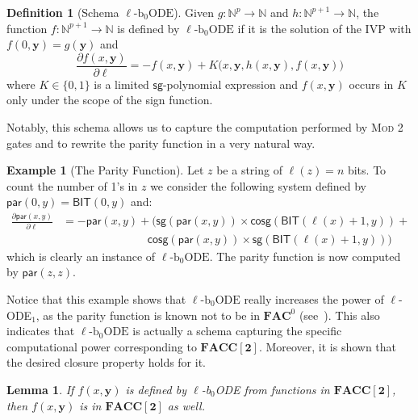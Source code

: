 \documentclass[11pt, oneside]{article}
\newcommand{\fun}[1]{\mathsf{#1}}
\newcommand{\Nat}{\mathbb{N}}
\newcommand{\AC}{\mathbf{FAC}}
\newcommand{\FACC}{\mathbf{FACC[2]}}
\newcommand{\tu}[1]{\mathbf{#1}}
\newtheorem{lemma}{Lemma}
\theoremstyle{definition}
\newtheorem{defn}{Definition}
\newtheorem{example}{Example}
\newcommand{\schODE}{\ell\text{-b}_0\text{ODE}}
\begin{document}
\begin{defn}[Schema $\schODE$]
    Given $g:\Nat^p \to \Nat$ and $h:\Nat^{p+1}\to \Nat$, the function $f:\Nat^{p+1} \to \Nat$ is defined by $\schODE$ if it is the solution of the IVP with $f(0, \tu y) = g(\tu y)$ and
    $$
    \frac{\partial f(x, \tu y)}{\partial \ell} = -f(x, \tu y) + K\big(x, \tu y, h(x, \tu y), f(x, \tu y)\big)
    $$
     where $K\in \{0,1\}$ is a limited $\fun{sg}$-polynomial expression and $f(x, \tu y)$ occurs in $K$ only under the scope of the sign function.
\end{defn}




Notably, this schema allows us to capture the computation performed by \textsc{Mod 2} gates and to rewrite the parity function in a very natural way.

\begin{example}[The Parity Function]\label{ex:parity}
      Let $z$ be a string of $\ell(z)=n$ bits.
      To count the number of 1's in $z$ we consider the following system defined by $ \fun{par}(0, y) = \fun{BIT}(0, y)$ and:
      \begin{align*}
          \frac{\partial \fun{par}(x, y)}{\partial \ell} &= - \fun{par}(x,  y) + \big(\fun{sg}(\fun{par}(x, y))\times \fun{cosg}(\fun{BIT}(\ell(x) + 1, y)) + \\
          &\quad \quad \quad \quad \quad \quad \quad \; \;
          \fun{cosg}(\fun{par}(x, y)) \times \fun{sg}(\fun{BIT}(\ell(x) + 1, y))\big)
      \end{align*}
      which is clearly an instance of $\schODE$.
      The parity function is now computed by $\fun{par}(z,z)$.%
\end{example}
\noindent
Notice that this example shows that $\schODE$ really increases the power of $\ell$-ODE$_1$, as the parity function is known not to be in $\AC^0$ (see~\cite{DBLP:conf/focs/FurstSS81}).
%
This also indicates that $\schODE$ is actually a schema capturing the specific computational power corresponding to $\FACC$.
Moreover, it is shown that the desired closure property holds for it.




\begin{lemma}\label{lemma:schODE}
    If $f(x, \tu y)$ is defined by $\ell$\emph{-b}$_0$\emph{ODE} from functions in $\FACC$, then $f(x, \tu y)$ is in $\FACC$ as well.
\end{lemma}
\end{document}
